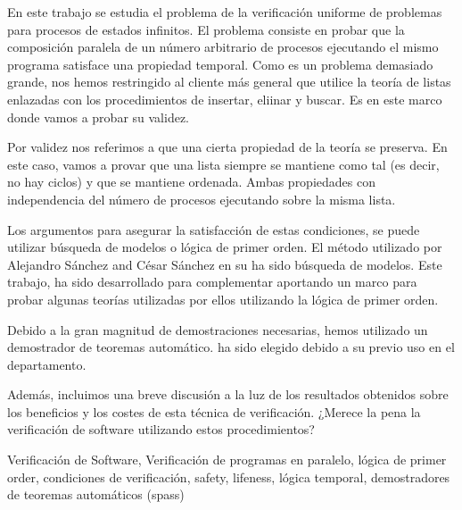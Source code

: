 \begin{abstractEs}
En este trabajo se estudia el problema de la verificación uniforme de problemas para procesos de estados infinitos. El problema consiste en probar que la composición paralela de un número arbitrario de procesos ejecutando el mismo programa satisface una propiedad temporal. Como es un problema demasiado grande, nos hemos restringido al cliente más general que utilice la teoría de listas enlazadas con los procedimientos de insertar, eliinar y buscar. Es en este marco donde vamos a probar su validez.

Por validez nos referimos a que una cierta propiedad de la teoría se preserva. En este caso, vamos a provar que una lista siempre se mantiene como tal (es decir, no hay ciclos) y que se mantiene ordenada. Ambas propiedades con independencia del número de procesos ejecutando sobre la misma lista.

Los argumentos para asegurar la satisfacción de estas condiciones, se puede utilizar búsqueda de modelos o lógica de primer orden. El método utilizado por Alejandro Sánchez and César Sánchez en su  ha sido búsqueda de modelos. Este trabajo, ha sido desarrollado para complementar  aportando un marco para probar algunas teorías utilizadas por ellos utilizando la lógica de primer orden.

Debido a la gran magnitud de demostraciones necesarias, hemos utilizado un demostrador de teoremas automático.  ha sido elegido debido a su previo uso en el departamento.

Además, incluimos una breve discusión a la luz de los resultados obtenidos sobre los beneficios y los costes de esta técnica de verificación. ¿Merece la pena la verificación de software utilizando estos procedimientos?


\end{abstractEs}

\begin{keywordsEs}
Verificación de Software, Verificación de programas en paralelo, lógica de primer order, condiciones de verificación, safety, lifeness, lógica temporal, demostradores de teoremas automáticos (spass)
\end{keywordsEs}

